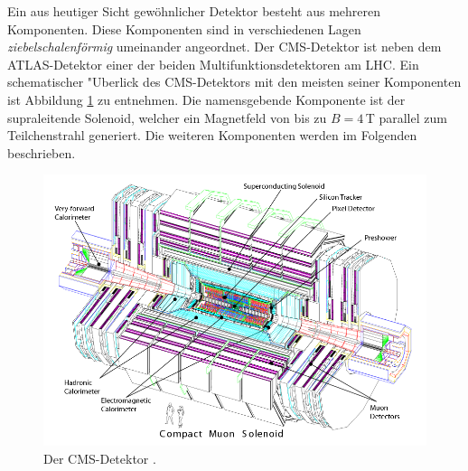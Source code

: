 Ein aus heutiger Sicht gew\"ohnlicher Detektor besteht aus mehreren Komponenten. Diese Komponenten sind in verschiedenen Lagen \textit{ziebelschalenf\"ormig} umeinander angeordnet. Der CMS-Detektor ist neben dem ATLAS-Detektor einer der beiden Multifunktionsdetektoren am LHC. Ein schematischer "Uberlick des CMS-Detektors mit den meisten seiner Komponenten ist Abbildung \ref{cmsdetektor} zu entnehmen. Die namensgebende Komponente ist der supraleitende Solenoid, welcher ein Magnetfeld von bis zu $B=4$\,T parallel zum Teilchenstrahl generiert. Die weiteren Komponenten werden im Folgenden beschrieben.\\

	\begin{figure}[t]
		\centering
		\includegraphics[scale=0.50]{LHC/cms_complete}
		\caption[Der CMS-Detektor]{Der CMS-Detektor \cite{Chatrchyan:2008aa}.}
		\label{cmsdetektor}
	\end{figure}

